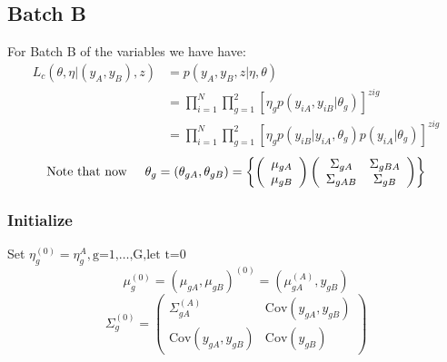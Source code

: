 \documentclass[a4paper,12pt]{article}\usepackage[]{graphicx}\usepackage[]{color}
\begin{document}
\subsection{Batch B}
For Batch B of the variables we have have:\\
 \noindent{}
\begin{align*}
L_{c}\left(\theta,\eta|\left(y_{A}, y_{B}\right),z \right) &= p \left(y_{A}, y_{B}, z | \eta, \theta \right)\\
&=\prod_{i=1}^{N} \prod_{g=1}^{2} \left[\eta_g p \left(y_{iA}, y_{iB} | \theta_g \right) \right]^{zig}\\
&=\prod_{i=1}^{N} \prod_{g=1}^{2} \left[\eta_g p \left(y_{iB}|y_{iA},\theta_{g} \right) p \left(y_{iA}|\theta_{g} \right) \right]^{zig}
\end{align*}
 \noindent{}
\[
\text{Note that now} \hspace{5mm}
\theta_{g} = \left(\theta_{gA}, \theta_{gB} \right) = \left\{
\left(\begin{array}{c}
\mu_{gA} \\
\mu_{gB} \end{array} \right)
\left(\begin{array}{cc}
\Sigma_{gA} & \Sigma_{gBA} \\
\Sigma_{gAB} & \Sigma_{gB}\end{array}\right)
\right\}
\]
\subsubsection*{Initialize}
Set \hspace{5mm} $\eta^{\left(0\right)}_{g}=\eta_{g}^{A}, \text{g=1,$\ldots$,G,let t=0}$\\
\noindent{}
\[
\mu_{g}^{\left(0\right)}=\left(\mu_{gA}, \mu_{gB} \right)^{\left(0 \right)}=\left(\mu_{gA}^{\left(A \right)},y_{gB} \right)
\]
\[\Sigma_{g}^{\left(0 \right)}=
\left(\begin{array}{cc}
\Sigma_{gA}^{\left(A\right)} & \text{Cov} \left(y_{gA},y_{gB} \right) \\
\text{Cov} \left(y_{gA}, y_{gB} \right) & \text{Cov} \left( y_{gB}\right)\end{array}\right)
\]
\end{document}
